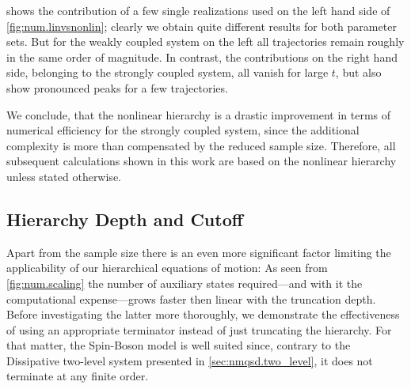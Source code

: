  shows the contribution of a few single realizations used on the left hand side of \autoref{fig:num.linvsnonlin}; clearly we obtain quite different results for both parameter sets.
But for the weakly coupled system on the left all trajectories remain roughly in the same order of magnitude.
In contrast, the contributions on the right hand side, belonging to the strongly coupled system, all vanish for large $t$, but also show pronounced peaks for a few trajectories.

We conclude, that the nonlinear hierarchy is a drastic improvement in terms of numerical efficiency for the strongly coupled system, since the additional complexity is more than compensated by the reduced sample size.
Therefore, all subsequent calculations shown in this work are based on the nonlinear hierarchy unless stated otherwise.


\subsection{Hierarchy Depth and Cutoff}
\label{sub:num.spin_boson.depth}
%

Apart from the sample size there is an even more significant factor limiting the applicability of our hierarchical equations of motion:
As seen from \autoref{fig:num.scaling} the number of auxiliary states required---and with it the computational expense---grows faster then linear with the truncation depth.
Before investigating the latter more thoroughly, we demonstrate the effectiveness of using an appropriate terminator instead of just truncating the hierarchy.
For that matter, the Spin-Boson model is well suited since, contrary to the Dissipative two-level system presented in \autoref{sec:nmqsd.two_level}, it does not terminate at any finite order.

